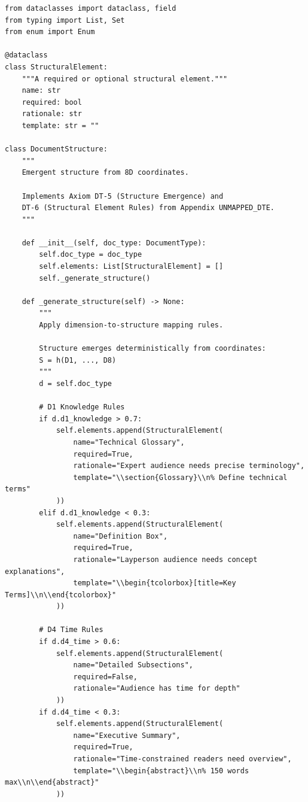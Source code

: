 \begin{verbatim}
from dataclasses import dataclass, field
from typing import List, Set
from enum import Enum

@dataclass
class StructuralElement:
    """A required or optional structural element."""
    name: str
    required: bool
    rationale: str
    template: str = ""

class DocumentStructure:
    """
    Emergent structure from 8D coordinates.

    Implements Axiom DT-5 (Structure Emergence) and
    DT-6 (Structural Element Rules) from Appendix UNMAPPED_DTE.
    """

    def __init__(self, doc_type: DocumentType):
        self.doc_type = doc_type
        self.elements: List[StructuralElement] = []
        self._generate_structure()

    def _generate_structure(self) -> None:
        """
        Apply dimension-to-structure mapping rules.

        Structure emerges deterministically from coordinates:
        S = h(D1, ..., D8)
        """
        d = self.doc_type

        # D1 Knowledge Rules
        if d.d1_knowledge > 0.7:
            self.elements.append(StructuralElement(
                name="Technical Glossary",
                required=True,
                rationale="Expert audience needs precise terminology",
                template="\\section{Glossary}\\n% Define technical terms"
            ))
        elif d.d1_knowledge < 0.3:
            self.elements.append(StructuralElement(
                name="Definition Box",
                required=True,
                rationale="Layperson audience needs concept explanations",
                template="\\begin{tcolorbox}[title=Key Terms]\\n\\end{tcolorbox}"
            ))

        # D4 Time Rules
        if d.d4_time > 0.6:
            self.elements.append(StructuralElement(
                name="Detailed Subsections",
                required=False,
                rationale="Audience has time for depth"
            ))
        if d.d4_time < 0.3:
            self.elements.append(StructuralElement(
                name="Executive Summary",
                required=True,
                rationale="Time-constrained readers need overview",
                template="\\begin{abstract}\\n% 150 words max\\n\\end{abstract}"
            ))


\end{verbatim}
